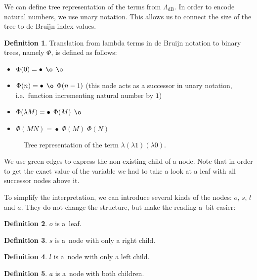 \documentclass[final]{article}
\theoremstyle{definition}
\newtheorem{definition}{Definition}[subsection]
\theoremstyle{definition}
\theoremstyle{remark}
\newcommand{\LambdadB}{\ensuremath{\Lambda_{\text{dB}}}}
\DeclareMathOperator{\n}{\bullet}
\DeclareMathOperator{\no}{\o}
\begin{document}
We can define tree representation of the terms from \(\LambdadB\). In order to encode natural numbers, we use unary notation. This allows us to connect the size of the tree to de Bruijn index values.

\begin{definition}
    Translation from lambda terms in de Bruijn notation to binary trees, namely \(\Phi\), is defined as follows:
    \begin{itemize}
        \item \(\Phi(0) = \n\; \no\; \no\)
        \item \(\Phi(n) = \n\; \no\; \Phi(n - 1)\) (this node acts as a successor in unary notation, i.e.~function incrementing natural number by \(1\))
        \item \(\Phi(\lambda M) = \n\; \Phi(M)\; \no\)
        \item \(\Phi(M N) = \n\; \Phi(M)\; \Phi(N)\)
    \end{itemize}
\end{definition}

\begin{figure}[H]
    \centering
    
    \caption{Tree representation of the term \(\lambda (\lambda 1) (\lambda 0)\).}%
    \label{fig:lambda_tree_example_2}
\end{figure}

We use green edges to express the non-existing child of a node. Note that in order to get the exact value of the variable we had to take a look at a leaf with all successor nodes above it.

To simplify the interpretation, we can introduce several kinds of the nodes: \(o\), \(s\), \(l\) and \(a\). They do not change the structure, but make the reading a~bit easier:

\begin{definition}
    \(o\) is a~leaf.
\end{definition}

\begin{definition}
    \(s\) is a~node with only a right child.
\end{definition}

\begin{definition}
    \(l\) is a~node with only a left child.
\end{definition}

\begin{definition}
    \(a\) is a~node with both children.
\end{definition}
\end{document}

